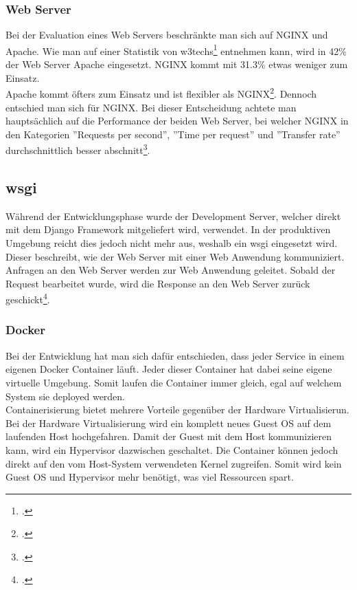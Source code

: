 \subsubsection*{Web Server}
Bei der Evaluation eines Web Servers beschränkte man sich auf NGINX und Apache. Wie man auf einer Statistik von w3techs\footcite{webserver_usage} entnehmen kann, wird in 42\% der Web Server Apache eingesetzt. NGINX kommt mit 31.3\% etwas weniger zum Einsatz. \\

Apache kommt öfters zum Einsatz und ist flexibler als NGINX\footcite{webserver_comparison}. Dennoch entschied man sich für NGINX. Bei dieser Entscheidung achtete man hauptsächlich auf die Performance der beiden Web Server, bei welcher NGINX in den Kategorien ''Requests per second'', ''Time per request'' und ''Transfer rate'' durchschnittlich besser abschnitt\footcite{webserver_performance}.

\subsection*{\gls{wsgi}}
Während der Entwicklungsphase wurde der Development Server, welcher direkt mit dem Django Framework mitgeliefert wird, verwendet. In der produktiven Umgebung reicht dies jedoch nicht mehr aus, weshalb ein \gls{wsgi} eingesetzt wird. Dieser beschreibt, wie der Web Server mit einer Web Anwendung kommuniziert. Anfragen an den Web Server werden zur Web Anwendung geleitet. Sobald der Request bearbeitet wurde, wird die Response an den Web Server zurück geschickt\footcite{wsgi_description}.

\subsubsection{Docker}
Bei der Entwicklung hat man sich dafür entschieden, dass jeder Service in einem eigenen Docker Container läuft. Jeder dieser Container hat dabei seine eigene virtuelle Umgebung. Somit laufen die Container immer gleich, egal auf welchem System sie deployed werden. \\

Containerisierung bietet mehrere Vorteile gegenüber der Hardware Virtualisierun. Bei der Hardware Virtualisierung wird ein komplett neues Guest OS auf dem laufenden Host hochgefahren. Damit der Guest mit dem Host kommunizieren kann, wird ein Hypervisor dazwischen geschaltet. Die Container können jedoch direkt auf den vom Host-System verwendeten Kernel zugreifen. Somit wird kein Guest OS und Hypervisor mehr benötigt, was viel Ressourcen spart. \\


